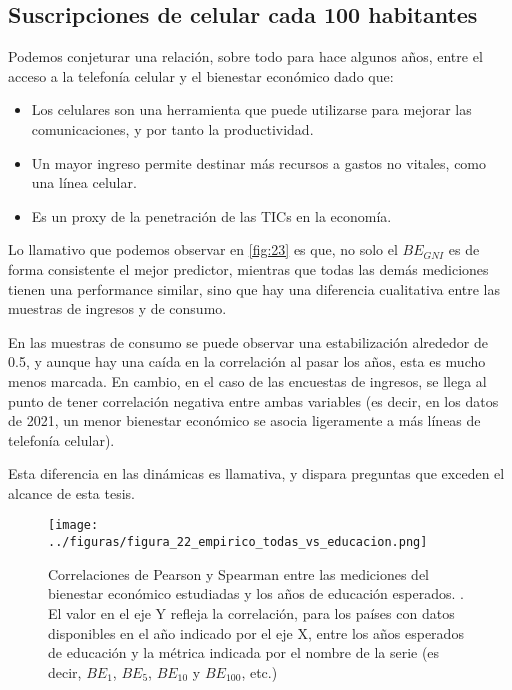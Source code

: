 \subsection{Suscripciones de celular cada 100 habitantes}

Podemos conjeturar una relación, sobre todo para hace algunos años, entre el acceso a la telefonía celular y el bienestar económico dado que:

\begin{itemize}
    \item Los celulares son una herramienta que puede utilizarse para mejorar las comunicaciones, y por tanto la productividad.
    \item Un mayor ingreso permite destinar más recursos a gastos no vitales, como una línea celular.
    \item Es un proxy de la penetración de las TICs en la economía.
\end{itemize}

Lo llamativo que podemos observar en \ref{fig:23} es que, no solo el $BE_{GNI}$ es de forma consistente el mejor predictor, mientras que todas las demás mediciones tienen una performance similar, sino que hay una diferencia cualitativa entre las muestras de ingresos y de consumo.

En las muestras de consumo se puede observar una estabilización alrededor de 0.5, y aunque hay una caída en la correlación al pasar los años, esta es mucho menos marcada. En cambio, en el caso de las encuestas de ingresos, se llega al punto de tener correlación negativa entre ambas variables (es decir, en los datos de 2021, un menor bienestar económico se asocia ligeramente a más líneas de telefonía celular).

Esta diferencia en las dinámicas es llamativa, y dispara preguntas que exceden el alcance de esta tesis.

\begin{figure}[H] %
    \centering %
    \texttt{[image: ../figuras/figura\_22\_empirico\_todas\_vs\_educacion.png]} %
    \caption{Correlaciones de Pearson y Spearman entre las mediciones del bienestar económico estudiadas y los años de educación esperados. \cite{worldbank_gender_data}. El valor en el eje Y refleja la correlación, para los países con datos disponibles en el año indicado por el eje X, entre los años esperados de educación y la métrica indicada por el nombre de la serie (es decir, $BE_1$, $BE_5$, $BE_{10}$ y $BE_{100}$, etc.)}
    \label{fig:22} %
\end{figure}


